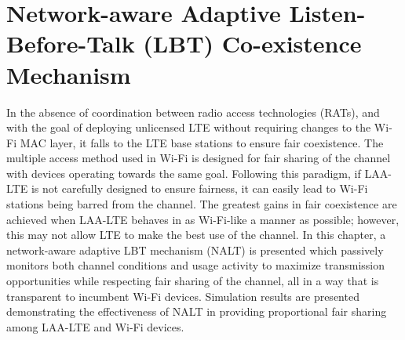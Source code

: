 %
%
%


\chapter{Network-aware Adaptive Listen-Before-Talk (LBT) Co-existence Mechanism}
\label{intro-NALT} %



In the absence of coordination between radio access technologies (RATs), and with the goal of deploying unlicensed LTE without requiring changes to the Wi-Fi MAC layer, it falls to the LTE base stations to ensure fair coexistence. The multiple access method used in Wi-Fi is designed for fair sharing of the channel with devices operating towards the same goal. Following this paradigm, if LAA-LTE is not carefully designed to ensure fairness, it can easily lead to Wi-Fi stations being barred from the channel. The greatest gains in fair coexistence are achieved when LAA-LTE behaves in as Wi-Fi-like a manner as possible; however, this may not allow LTE to make the best use of the channel.  In this chapter, a network-aware adaptive LBT mechanism (NALT) is presented which passively monitors both channel conditions and usage activity to maximize transmission opportunities while respecting fair sharing of the channel, all in a way that is transparent to incumbent Wi-Fi devices. Simulation results are presented demonstrating the effectiveness of NALT in providing proportional fair sharing among LAA-LTE and Wi-Fi devices.

